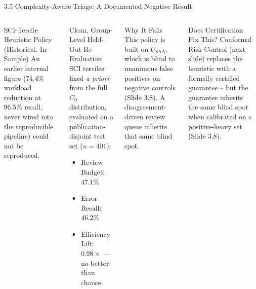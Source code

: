 \documentclass[aspectratio=169,11pt]{beamer}
\begin{document}
\begin{frame}{3.5 Complexity-Aware Triage: A Documented Negative Result}
\scriptsize
\begin{columns}[T]
\begin{alertblock}{SCI-Tercile Heuristic Policy (Historical, In-Sample)}
An earlier internal figure ($74.4\%$ workload reduction at $96.5\%$ recall, never wired into the reproducible pipeline) could not be reproduced.
\end{alertblock}

\begin{block}{Clean, Group-Level Held-Out Re-Evaluation}
SCI terciles fixed \emph{a priori} from the full $C_0$ distribution, evaluated on a publication-disjoint test set ($n=401$):
\begin{itemize}
    \item Review Budget: $47.1\%$
    \item Error Recall: $46.2\%$
    \item Efficiency Lift: $\mathbf{0.98\times}$ --- no better than chance.
\end{itemize}
\end{block}

\begin{block}{Why It Fails}
This policy is built on $U_{\text{SAA}}$, which is blind to unanimous false positives on negative controls (Slide 3.8). A disagreement-driven review queue inherits that same blind spot.
\end{block}
\begin{alertblock}{Does Certification Fix This?}
Conformal Risk Control (next slide) replaces the heuristic with a formally certified guarantee -- but the guarantee inherits the same blind spot when calibrated on a positive-heavy set (Slide 3.8).
\end{alertblock}
\end{columns}
\end{frame}
\end{document}

